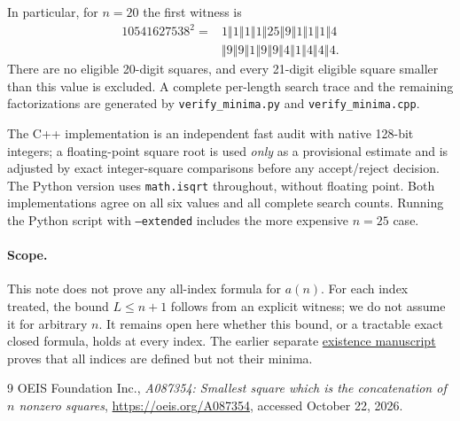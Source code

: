 \documentclass[10pt]{article}
\theoremstyle{definition}
\newcommand{\cat}{\mathbin{\Vert}}
\begin{document}
In particular, for $n=20$ the first witness is
\[
\begin{split}
10541627538^2={}&1\cat1\cat1\cat1\cat25\cat9\cat1\cat1\cat1\cat4\\
 &\cat9\cat9\cat1\cat9\cat9\cat4\cat1\cat4\cat4\cat4.\end{split}
\]
There are no eligible 20-digit squares, and every 21-digit eligible
square smaller than this value is excluded. A complete per-length
search trace and the remaining factorizations are generated by
\texttt{verify\_minima.py} and \texttt{verify\_minima.cpp}.

The C++ implementation is an independent fast audit with native
128-bit integers; a floating-point square root is used \emph{only}
as a provisional estimate and is adjusted by exact integer-square
comparisons before any accept/reject decision. The Python version
uses \texttt{math.isqrt} throughout, without floating point. Both
implementations agree on all six values and all complete search
counts. Running the Python script with \texttt{--extended} includes
the more expensive $n=25$ case.

\paragraph{Scope.} This note does not prove any all-index formula for
$a(n)$. For each index treated, the bound $L\leq n+1$ follows from
an explicit witness; we do not assume it for arbitrary $n$.
It remains open here whether this bound, or a tractable exact
closed formula, holds at every index. The earlier separate
\href{https://github.com/dongxuelian2/oeis-papers/tree/main/papers/A087354}{existence manuscript}
proves that all indices are defined but not their minima.

\begin{thebibliography}{9}
 OEIS Foundation Inc.,
\emph{A087354: Smallest square which is the concatenation of $n$
nonzero squares}, \url{https://oeis.org/A087354},
accessed October 22, 2026.
\end{thebibliography}
\end{document}
